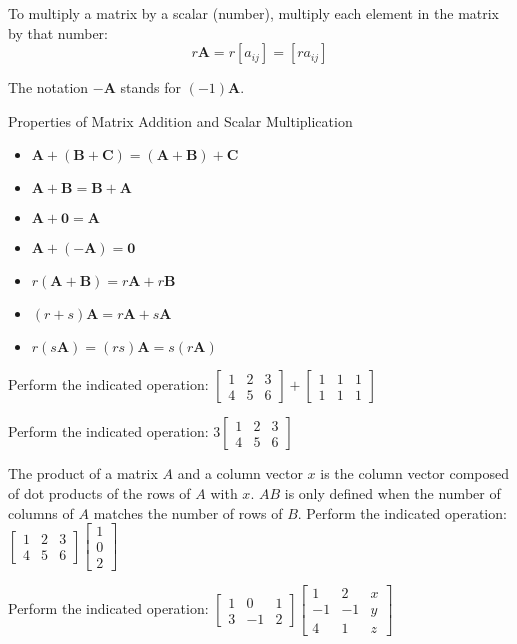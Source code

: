 \documentclass[../diffeq.tex]{subfiles}
\begin{document}
To multiply a matrix by a scalar (number), multiply each element in the matrix by that number:
\[ r\textbf{A}=r[a_{ij}]=[ra_{ij}]\]

The notation $-\textbf{A}$ stands for $(-1)\textbf{A}$.

Properties of Matrix Addition and Scalar Multiplication
\begin{itemize}
    \item $\textbf{A}+(\textbf{B}+\textbf{C})=(\textbf{A}+\textbf{B})+\textbf{C}$
    \item $\textbf{A}+\textbf{B}=\textbf{B}+\textbf{A}$
    \item $\textbf{A}+\textbf{0}=\textbf{A}$
    \item $\textbf{A}+(-\textbf{A})=\textbf{0}$
    \item $r(\textbf{A}+\textbf{B})=r\textbf{A}+r\textbf{B}$
    \item $(r+s)\textbf{A}=r\textbf{A}+s\textbf{A}$
    \item $r(s\textbf{A})=(rs)\textbf{A}=s(r\textbf{A})$
\end{itemize}

\ex Perform the indicated operation:
$\begin{bmatrix}
    1 & 2 & 3\\
    4 & 5 & 6
\end{bmatrix}+
\begin{bmatrix}
    1 & 1 & 1\\
    1 & 1 & 1
\end{bmatrix}
$

\ex Perform the indicated operation:
$3\begin{bmatrix}
  1&2&3\\4&5&6  
\end{bmatrix}$

The product of a matrix $A$ and a column vector $x$ is the column vector composed of dot products of the rows of $A$ with $x$. $AB$ is only defined when the number of columns of $A$ matches the number of rows of $B$.
\ex Perform the indicated operation: 
$\begin{bmatrix}
    1&2&3\\
    4&5&6
\end{bmatrix}\begin{bmatrix}
    1\\0\\2
\end{bmatrix}$

\ex Perform the indicated operation:
$\begin{bmatrix}
    1&0&1\\
    3&-1&2
\end{bmatrix}\begin{bmatrix}
    1&2&x\\
    -1&-1&y\\
    4&1&z
\end{bmatrix}$
\end{document}
